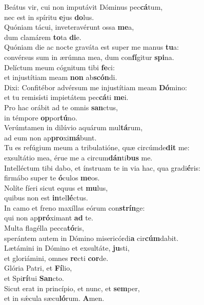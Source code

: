 \evenverse Beátus vir, cui non imputávit Dóminus pec\textbf{cá}tum,~\*\\
\evenverse nec est in spíritu \textbf{e}jus \textbf{do}lus.\\
\oddverse Quóniam tácui, inveteravérunt ossa \textbf{me}a,~\*\\
\oddverse dum clamárem \textbf{to}ta \textbf{di}e.\\
\evenverse Quóniam die ac nocte graváta est super me manus \textbf{tu}a:~\*\\
\evenverse convérsus sum in ærúmna mea, dum con\textbf{fí}gitur \textbf{spi}na.\\
\oddverse Delíctum meum cógnitum tibi \textbf{fe}ci:~\*\\
\oddverse et injustítiam meam \textbf{non} ab\textbf{scón}di.\\
\evenverse Dixi: Confitébor advérsum me injustítiam meam \textbf{Dó}mino:~\*\\
\evenverse et tu remisísti impietátem pec\textbf{cá}ti \textbf{me}i.\\
\oddverse Pro hac orábit ad te omnis \textbf{san}ctus,~\*\\
\oddverse in témpore \textbf{op}por\textbf{tú}no.\\
\evenverse Verúmtamen in dilúvio aquárum mul\textbf{tá}rum,~\*\\
\evenverse ad eum non ap\textbf{pro}xi\textbf{má}bunt.\\
\oddverse Tu es refúgium meum a tribulatióne, quæ circúmde\textbf{dit} me:~\*\\
\oddverse exsultátio mea, érue me a circum\textbf{dán}ti\textbf{bus} me.\\
\evenverse Intelléctum tibi dabo, et ínstruam te in via hac, qua gradi\textbf{é}ris:~\*\\
\evenverse firmábo super te \textbf{ó}culos \textbf{me}os.\\
\oddverse Nolíte fíeri sicut equus et \textbf{mu}lus,~\*\\
\oddverse quibus non est \textbf{in}tel\textbf{lé}ctus.\\
\evenverse In camo et freno maxíllas eórum con\textbf{strín}ge:~\*\\
\evenverse qui non ap\textbf{pró}ximant \textbf{ad} te.\\
\oddverse Multa flagélla pecca\textbf{tó}ris,~\*\\
\oddverse sperántem autem in Dómino misericórdi\textbf{a} cir\textbf{cúm}dabit.\\
\evenverse Lætámini in Dómino et exsultáte, \textbf{ju}sti,~\*\\
\evenverse et gloriámini, omnes \textbf{re}cti \textbf{cor}de.\\
\oddverse Glória Patri, et \textbf{Fí}lio,~\*\\
\oddverse et Spi\textbf{rí}tui \textbf{San}cto.\\
\evenverse Sicut erat in princípio, et nunc, et \textbf{sem}per,~\*\\
\evenverse et in sǽcula sæcu\textbf{ló}rum. \textbf{A}men.\\
